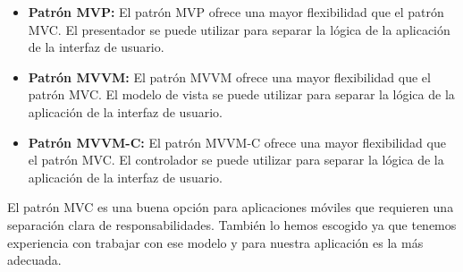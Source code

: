 \begin{itemize}
	\item \textbf{Patrón MVP:} El patrón MVP ofrece una mayor flexibilidad que el patrón MVC. El presentador se puede utilizar para separar la lógica de la aplicación de la interfaz de usuario.
	\item \textbf{Patrón MVVM:} El patrón MVVM ofrece una mayor flexibilidad que el patrón MVC. El modelo de vista se puede utilizar para separar la lógica de la aplicación de la interfaz de usuario.
	\item \textbf{Patrón MVVM-C:} El patrón MVVM-C ofrece una mayor flexibilidad que el patrón MVC. El controlador se puede utilizar para separar la lógica de la aplicación de la interfaz de usuario.
\end{itemize}
El patrón MVC es una buena opción para aplicaciones móviles que requieren una separación clara de responsabilidades. También lo hemos escogido ya que tenemos experiencia con trabajar con ese modelo y para nuestra aplicación es la más adecuada.